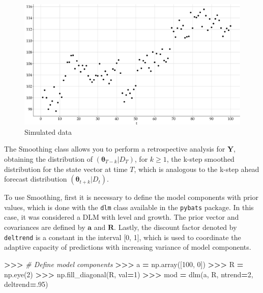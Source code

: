 \documentclass[
]{article}
\newenvironment{Shaded}{\begin{snugshade}}{\end{snugshade}}
\newcommand{\CommentTok}[1]{\textcolor[rgb]{0.56,0.35,0.01}{\textit{#1}}}
\newcommand{\DecValTok}[1]{\textcolor[rgb]{0.00,0.00,0.81}{#1}}
\newcommand{\FloatTok}[1]{\textcolor[rgb]{0.00,0.00,0.81}{#1}}
\newcommand{\NormalTok}[1]{#1}
\newcommand{\OperatorTok}[1]{\textcolor[rgb]{0.81,0.36,0.00}{\textbf{#1}}}
\begin{document}
\begin{figure}

{\centering \includegraphics[width=0.9\linewidth]{pybats_detection_files/figure-latex/unnamed-chunk-2-1} 

}

\caption{Simulated data}\label{fig:unnamed-chunk-2}
\end{figure}

The Smoothing class allows you to perform a retrospective analysis for
\(\mathbf{Y}\), obtaining the distribution of
\((\boldsymbol{\theta}_{T-k} \vert D_T)\), for \(k \geq 1\), the k-step
smoothed distribution for the state vector at time \(T\), which is
analogous to the k-step ahead forecast distribution
\((\boldsymbol{\theta}_{t+k}\vert D_t)\).

To use Smoothing, first it is necessary to define the model components
with prior values, which is done with the \texttt{dlm} class available
in the \texttt{pybats} package. In this case, it was considered a DLM
with level and growth. The prior vector and covariances are defined by
\(\mathbf{a}\) and \(\mathbf{R}\). Lastly, the discount factor denoted
by \texttt{deltrend} is a constant in the interval {[}0, 1{]}, which is
used to coordinate the adaptive capacity of predictions with increasing
variance of model components.

\begin{Shaded}
\begin{Highlighting}[]
\OperatorTok{\textgreater{}\textgreater{}\textgreater{}} \CommentTok{\# Define model components}
\OperatorTok{\textgreater{}\textgreater{}\textgreater{}}\NormalTok{ a }\OperatorTok{=}\NormalTok{ np.array([}\DecValTok{100}\NormalTok{, }\DecValTok{0}\NormalTok{])}
\OperatorTok{\textgreater{}\textgreater{}\textgreater{}}\NormalTok{ R }\OperatorTok{=}\NormalTok{ np.eye(}\DecValTok{2}\NormalTok{)}
\OperatorTok{\textgreater{}\textgreater{}\textgreater{}}\NormalTok{ np.fill\_diagonal(R, val}\OperatorTok{=}\DecValTok{1}\NormalTok{)}
\OperatorTok{\textgreater{}\textgreater{}\textgreater{}}\NormalTok{ mod }\OperatorTok{=}\NormalTok{ dlm(a, R, ntrend}\OperatorTok{=}\DecValTok{2}\NormalTok{, deltrend}\OperatorTok{=}\FloatTok{.95}\NormalTok{)}
\end{Highlighting}
\end{Shaded}
\end{document}
